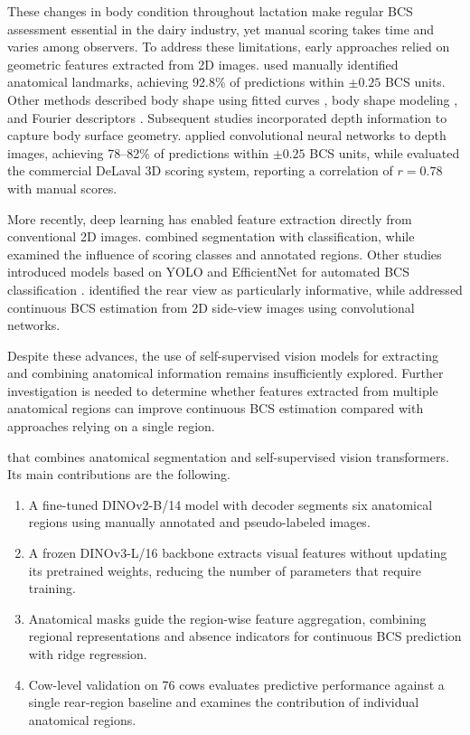 These changes in body condition throughout lactation make regular BCS assessment essential in the dairy industry, yet manual scoring takes time and varies among observers.
To address these limitations, early approaches relied on geometric features extracted from 2D images.
\citet{bewley2008} used manually identified anatomical landmarks, achieving 92.8\% of predictions within $\pm0.25$ BCS units.
Other methods described body shape using fitted curves \citep{halachmi2008}, body shape modeling \citep{azzaro2011}, and Fourier descriptors \citep{bercovich2013}.
Subsequent studies incorporated depth information to capture body surface geometry.
\citet{rodriguez2018,rodriguez2019} applied convolutional neural networks to depth images, achieving 78--82\% of predictions within $\pm0.25$ BCS units, while \citet{mullins2019} evaluated the commercial DeLaval 3D scoring system, reporting a correlation of $r = 0.78$ with manual scores.

More recently, deep learning has enabled feature extraction directly from conventional 2D images.
\citet{cevik2019} combined segmentation with  classification, while \citet{nagy2023} examined the influence of scoring classes and annotated regions.
Other studies introduced models based on YOLO and EfficientNet for automated BCS classification \citep{dandil2024,liu2025,zheng2024}.
\citet{lewis2025} identified the rear view as particularly informative, while \citet{yao2026} addressed continuous BCS estimation from 2D side-view images using convolutional networks.

Despite these advances, the use of self-supervised vision models for extracting and combining anatomical information remains insufficiently explored.
Further investigation is needed to determine whether features extracted from multiple anatomical regions can improve continuous BCS estimation compared with approaches relying on a single region.

 that combines anatomical segmentation and self-supervised vision transformers.
Its main contributions are the following.
\begin{enumerate}
  \item A fine-tuned DINOv2-B/14 model with  decoder segments six anatomical regions using manually annotated and pseudo-labeled images.
  \item A frozen DINOv3-L/16 backbone extracts visual features without updating its pretrained weights, reducing the number of parameters that require training.
  \item Anatomical masks guide the region-wise feature aggregation, combining regional representations and absence indicators for continuous BCS prediction with ridge regression.
  \item Cow-level validation on 76 cows evaluates predictive performance against a single rear-region baseline and examines the contribution of individual anatomical regions.
\end{enumerate}
